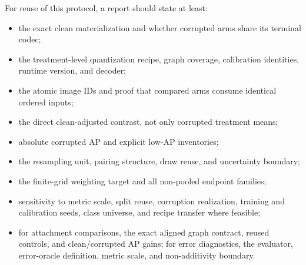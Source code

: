 \documentclass[10pt]{article}
\begin{document}
For reuse of this protocol, a report should state at least:
\begin{itemize}
  \item the exact clean materialization and whether corrupted arms share its
  terminal codec;
  \item the treatment-level quantization recipe, graph coverage, calibration
  identities, runtime version, and decoder;
  \item the atomic image IDs and proof that compared arms consume identical
  ordered inputs;
  \item the direct clean-adjusted contrast, not only corrupted treatment means;
  \item absolute corrupted AP and explicit low-AP inventories;
  \item the resampling unit, pairing structure, draw reuse, and uncertainty
  boundary;
  \item the finite-grid weighting target and all non-pooled endpoint families;
  \item sensitivity to metric scale, split reuse, corruption realization, training and
  calibration seeds, class universe, and recipe transfer where feasible;
  \item for attachment comparisons, the exact aligned graph contract, reused
  controls, and clean/corrupted AP gains; for error diagnostics, the evaluator,
  error-oracle definition, metric scale, and non-additivity boundary.
\end{itemize}

\FloatBarrier
\end{document}
